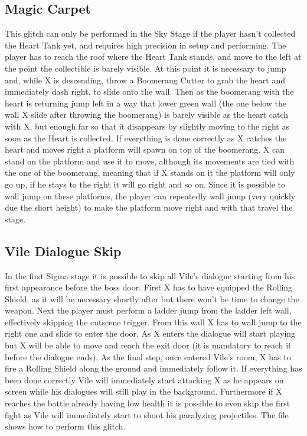 \subsection{Magic Carpet}
This glitch can only be performed in the Sky Stage if the player hasn't collected the Heart Tank yet, and requires high precision in setup and performing. The player has to reach the roof where the Heart Tank stands, and move to the left at the point the collectible is barely visible. At this point it is necessary to jump and, while X is descending, throw a Boomerang Cutter to grab the heart and immediately dash right, to slide onto the wall. Then as the boomerang with the heart is returning jump left in a way that lower green wall (the one below the wall X slide after throwing the boomerang) is barely visible as the heart catch with X, but enough far so that it disappears by slightly moving to the right as soon as the Heart is collected. If everything is done correctly as X catches the heart and moves right a platform will spawn on top of the boomerang. X can stand on the platform and use it to move, although its movements are tied with the one of the boomerang, meaning that if X stands on it the platform will only go up, if he stays to the right it will go right and so on. Since it is possible to wall jump on these platforms, the player can repeatedly wall jump (very quickly due the short height) to make the platform move right and with that travel the stage.

\subsection{Vile Dialogue Skip}
In the first Sigma stage it is possible to skip all Vile's dialogue starting from his first appearance before the boss door. First X has to have equipped the Rolling Shield, as it will be necessary shortly after but there won't be time to change the weapon. Next the player must perform a ladder jump from the ladder left wall, effectively skipping the cutscene trigger. From this wall X has to wall jump to the right one and slide to enter the door. As X enters the dialogue will start playing but X will be able to move and reach the exit door (it is mandatory to reach it before the dialogue ends). As the final step, once entered Vile's room, X has to fire a Rolling Shield along the ground and immediately follow it. If everything has been done correctly Vile will immediately start attacking X as he appears on screen while his dialogues will still play in the background. Furthermore if X reaches the battle already having low health it is possible to even skip the first fight as Vile will immediately start to shoot his paralyzing projectiles. The file  shows how to perform this glitch.

